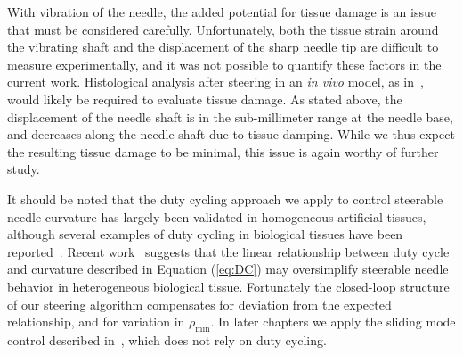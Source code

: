 With vibration of the needle, the added potential for tissue damage is an issue that must be considered carefully. Unfortunately, both the tissue strain around the vibrating shaft and the displacement of the sharp needle tip are difficult to measure experimentally, and it was not possible to quantify these factors in the current work. Histological analysis after steering in an \textit{in vivo} model, as in~\cite{Majewicz2012}, would likely be required to evaluate tissue damage. As stated above, the displacement of the needle shaft is in the sub-millimeter range at the needle base, and decreases along the needle shaft due to tissue damping. While we thus expect the resulting tissue damage to be minimal, this issue is again worthy of further study.

It should be noted that the duty cycling approach we apply to control steerable needle curvature has largely been validated in homogeneous artificial tissues, although several examples of duty cycling in biological tissues have been reported~\cite{Engh2010,Patil2014,Swaney2013}. Recent work~\cite{Patil2014} suggests that the linear relationship between duty cycle and curvature described in Equation (\ref{eq:DC}) may oversimplify steerable needle behavior in heterogeneous biological tissue. Fortunately the closed-loop structure of our steering algorithm compensates for deviation from the expected relationship, and for variation in $\rho_\text{min}$. In later chapters we apply the sliding mode control described in~\cite{Rucker2013}, which does not rely on duty cycling.